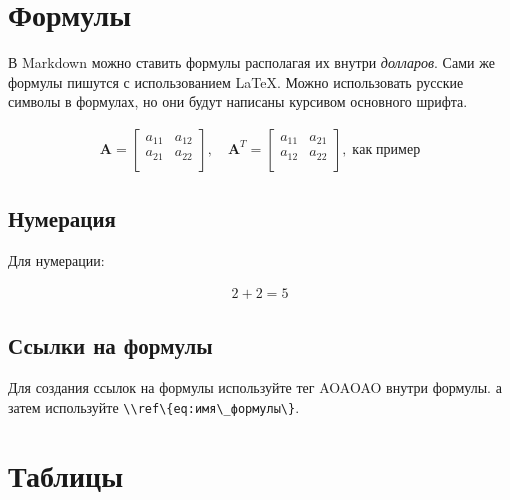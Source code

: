 \documentclass[a4paper]{article}
\renewcommand{\emph}[1]{\textit{#1}}
\newcommand{\passthrough}[1]{{\codefont #1}}
\begin{document}
\section{Формулы}\label{ux444ux43eux440ux43cux443ux43bux44b}

В Markdown можно ставить формулы располагая их внутри \emph{долларов}.
Сами же формулы пишутся с использованием \LaTeX. Можно использовать
русские символы в формулах, но они будут написаны курсивом основного
шрифта.

\begin{equation}\begin{gathered}
\mathbf{A} =
\begin{bmatrix}
a_{11} & a_{12} \\
a_{21} & a_{22} \\
\end{bmatrix}, \quad
\mathbf{A}^T =
\begin{bmatrix}
a_{11} & a_{21} \\
a_{12} & a_{22} \\
\end{bmatrix}
,\;\mathit{как}\;\mathit{пример}
\label{eq:Пример}
\end{gathered}\end{equation}

\subsection{Нумерация}\label{ux43dux443ux43cux435ux440ux430ux446ux438ux44f}

Для нумерации:

\begin{equation*}\begin{gathered}2+2=5
\end{gathered}\end{equation*}

\subsection{Ссылки на
формулы}\label{ux441ux441ux44bux43bux43aux438-ux43dux430-ux444ux43eux440ux43cux443ux43bux44b}

Для создания ссылок на формулы используйте тег AOAOAO внутри формулы. а
затем используйте \passthrough{\lstinline!\\ref\{eq:имя\_формулы\}!}.

\section{Таблицы}\label{ux442ux430ux431ux43bux438ux446ux44b}
\end{document}
